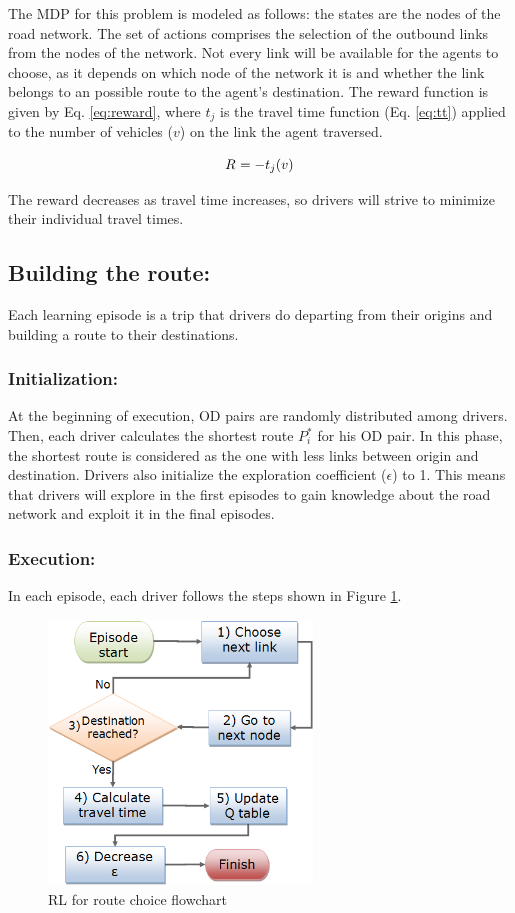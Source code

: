 \documentclass{RITA}
\newcommand{\travTime}{\ensuremath{t_j}} 	%
\newcommand{\veh}{\ensuremath{v}}		%
\newcommand{\reward}[1][]{\ensuremath{R_#1}}	%
\begin{document}
The MDP for this problem is modeled as follows: the states are the nodes of the road network. The set of actions comprises the selection of the outbound links from the nodes of the network. Not every link will be available for the agents to choose, as it depends on which node of the network it is and whether the link belongs to an possible route to the agent's destination. The reward function is given by Eq. \eqref{eq:reward}, where $\travTime$ is the travel time function (Eq. \eqref{eq:tt}) applied to the number of vehicles ($\veh$) on the link the agent traversed.

\begin{equation}
\label{eq:reward}
\reward{} = - \travTime(\veh)
\end{equation}

The reward decreases as travel time increases, so drivers will strive to minimize their individual travel times.

\subsection{Building the route:}

Each learning episode is a trip that drivers do departing from their origins and building a route to their destinations.

\subsubsection{Initialization:}
At the beginning of execution, OD pairs are randomly distributed among drivers. Then, each driver calculates the shortest route $P_i^*$ for his OD pair. In this phase, the shortest route is considered as the one with less links between origin and destination. Drivers also initialize the exploration coefficient ($\epsilon$) to 1. This means that drivers will explore in the first episodes to gain knowledge about the road network and exploit it in the final episodes.

\subsubsection{Execution:}

In each episode, each driver follows the steps shown in Figure \ref{fig:flowchart}.

\begin{figure}[ht]
    \centerline{\includegraphics[width=7cm]{img/flowchart3.png}}
    \caption{RL for route choice flowchart}
    \label{fig:flowchart}
\end{figure}
\end{document}
